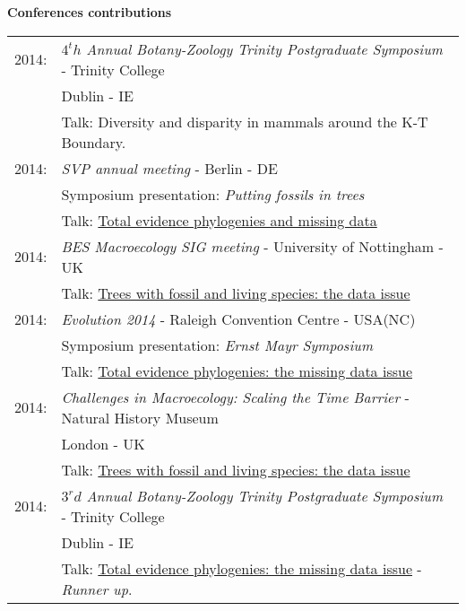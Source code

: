 \documentclass[10pt,a4paper]{article}
\begin{document}
{\raggedright\textbf{Conferences contributions}\\[1.5ex]
\begin{tabular}{ll}
2014: & \textit{$4^th$ Annual Botany-Zoology Trinity Postgraduate Symposium} - Trinity College\\
& Dublin - IE\\
& Talk: Diversity and disparity in mammals around the K-T Boundary.\\
2014: & \textit{SVP annual meeting} - Berlin - DE\\
& Symposium presentation: \textit{Putting fossils in trees}\\
& Talk: \href{http://figshare.com/articles/Total_evidence_phylogenies_the_missing_data_issue/1086216}{Total evidence phylogenies and missing data}\\
2014: & \textit{BES Macroecology SIG meeting} - University of Nottingham - UK\\
& Talk: \href{http://figshare.com/articles/Trees_with_fossil_and_living_species_the_data_issue/1056307}{Trees with fossil and living species: the data issue}\\
2014: & \textit{Evolution 2014} - Raleigh Convention Centre - USA(NC)\\
& Symposium presentation: \textit{Ernst Mayr Symposium} \\
& Talk: \href{http://figshare.com/articles/Total_evidence_phylogenies_the_missing_data_issue/1086216}{Total evidence phylogenies: the missing data issue}\\
2014: & \textit{Challenges in Macroecology: Scaling the Time Barrier} - Natural History Museum \\
& London - UK\\
& Talk: \href{http://figshare.com/articles/Trees_with_fossil_and_living_species_the_data_issue/1056307}{Trees with fossil and living species: the data issue}\\
2014: & \textit{$3^rd$ Annual Botany-Zoology Trinity Postgraduate Symposium} - Trinity College\\
& Dublin - IE\\
& Talk: \href{http://figshare.com/articles/Total_evidence_phylogenies_the_missing_data_issue/1086216}{Total evidence phylogenies: the missing data issue} - \textit{Runner up}.\\

\end{tabular}}
\end{document}
